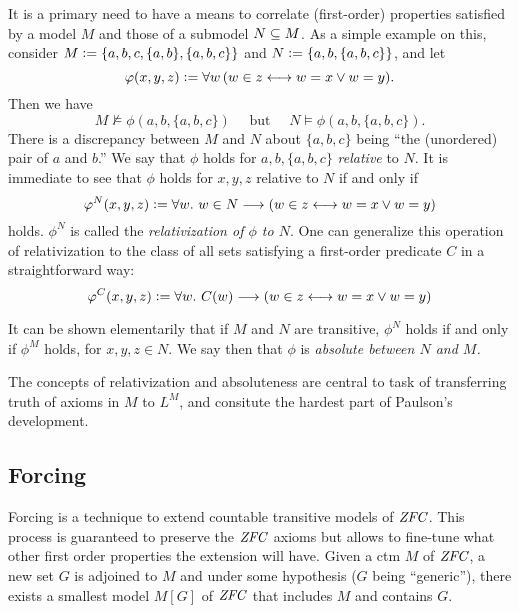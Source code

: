 It is a primary need to have a means to correlate  (first-order)
properties satisfied by a model $M$ and those of a 
submodel $N\subseteq M$. As a simple example on this, consider 
$M\mathrel{\mathop:}= \{a,b,c, \{a,b\},\{a,b,c\}\}$ and
$N\mathrel{\mathop:}=\{a,b,\{a,b,c\}\}$, and let 
\[
\varphi(x,y,z)\mathrel{\mathop:}= \forall w \,( w\in z \longleftrightarrow w=x \vee w=y).
\]
Then we have
\[
M\not\models \phi(a,b,\{a,b,c\}) \quad\text{ but }\quad N\models \phi(a,b,\{a,b,c\}).
\]
There is a discrepancy between  $M$ and $N$ about $\{a,b,c\}$ being ``the
(unordered) pair of $a$ and $b$.'' We say that $\phi$ holds for
$a,b,\{a,b,c\}$ \emph{relative} to $N$. It is immediate to see that
$\phi$ holds  for $x,y,z$ relative to $N$ if and only if
\[
\varphi^N(x,y,z)\mathrel{\mathop:}= \forall w.\ w\in N\longrightarrow ( w\in z \longleftrightarrow w=x \vee w=y)
\] 
holds. $\phi^N$ is called the \emph{relativization of $\phi$ to
  $N$}. One can generalize this operation of relativization to the
class of all sets satisfying a first-order predicate $C$ in a
straightforward way:
\[
\varphi^C(x,y,z)\mathrel{\mathop:}= \forall w.\ C(w)\longrightarrow ( w\in z \longleftrightarrow w=x \vee w=y)
\] 

It can be shown elementarily that if $M$ and $N$ are transitive,
$\phi^N$ holds if and only if $\phi^M$ holds,  for $x,y,z\in N$. We
say then that $\phi$ is \emph{absolute between $N$ and $M$.}

The concepts of relativization and absoluteness are central to task of
transferring truth of axioms in $M$ to  $L^M$, and consitute the
hardest part of Paulson's development. 


\subsection{Forcing}
Forcing is a technique to extend countable transitive models of
$\mathit{ZFC}$. This process is guaranteed to preserve the $\mathit{ZFC}$
axioms but allows to fine-tune what other first order properties the
extension will have. Given a ctm $M$ of $\mathit{ZFC}$, a new set $G$ is
adjoined to $M$ and under some hypothesis ($G$ being ``generic''),
there exists a smallest model $M[G]$ of $\mathit{ZFC}$ that includes $M$ and
contains $G$. 

